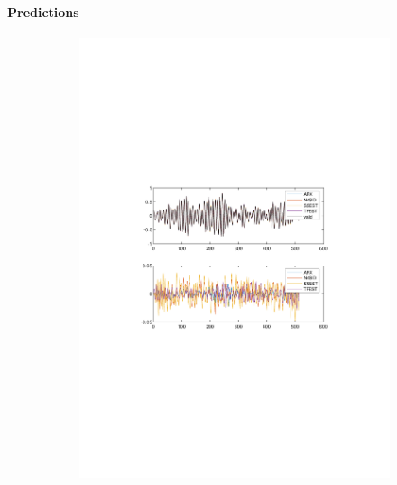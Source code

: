 \documentclass[]{article}
\begin{document}
\paragraph{Predictions}

\begin{figure}[ht]
\centering
\begin{subfigure}{.49\textwidth}
	\centering
	\includegraphics[trim= 10cm 8cm 10cm 8cm, scale=0.4]{figures/predictions.pdf}
\end{subfigure}
\begin{subfigure}{.49\textwidth}
	\centering

\end{subfigure}
\end{figure}
\end{document}
